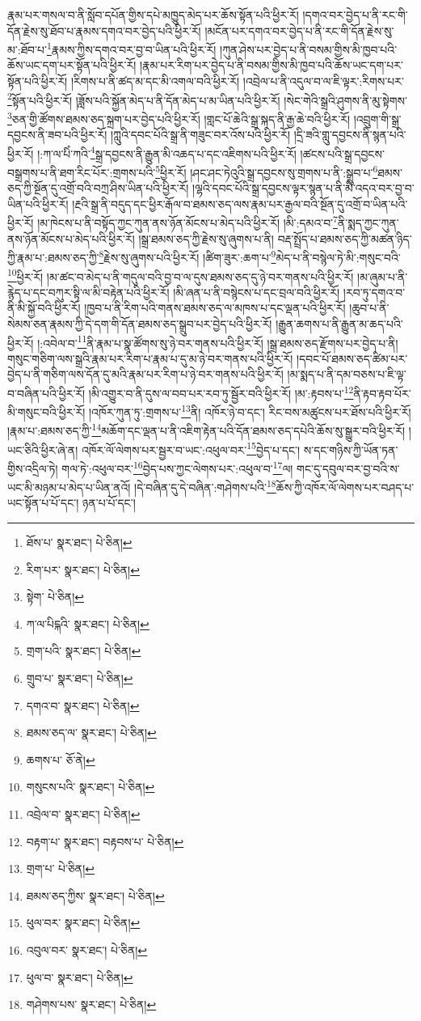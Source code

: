 རྣམ་པར་གསལ་བ་ནི་སློབ་དཔོན་གྱིས་དཔེ་མཁྱུད་མེད་པར་ཆོས་སྟོན་པའི་ཕྱིར་རོ། །དགའ་བར་བྱེད་པ་ནི་རང་གི་དོན་རྗེས་སུ་ཐོབ་པ་རྣམས་དགའ་བར་བྱེད་པའི་ཕྱིར་རོ། །མངོན་པར་དགའ་བར་བྱེད་པ་ནི་རང་གི་དོན་རྗེས་སུ་མ་:ཐོབ་པ་\footnote{ཐོས་པ་  སྣར་ཐང་།  པེ་ཅིན། }རྣམས་ཀྱིས་དགའ་བར་བྱ་བ་ཡིན་པའི་ཕྱིར་རོ། །ཀུན་ཤེས་པར་བྱེད་པ་ནི་བསམ་གྱིས་མི་ཁྱབ་པའི་ཆོས་ཡང་དག་པར་སྟོན་པའི་ཕྱིར་རོ། །རྣམ་པར་རིག་པར་བྱེད་པ་ནི་བསམ་གྱིས་མི་ཁྱབ་པའི་ཆོས་ཡང་དག་པར་སྟོན་པའི་ཕྱིར་རོ། །རིགས་པ་ནི་ཚད་མ་དང་མི་འགལ་བའི་ཕྱིར་རོ། །འབྲེལ་པ་ནི་འདུལ་བ་ལ་ཇི་ལྟར་:རིགས་པར་\footnote{རིག་པར་  སྣར་ཐང་།  པེ་ཅིན། }སྟོན་པའི་ཕྱིར་རོ། །ཟློས་པའི་སྐྱོན་མེད་པ་ནི་དོན་མེད་པ་མ་ཡིན་པའི་ཕྱིར་རོ། །སེང་གེའི་སྒྲའི་ཤུགས་ནི་མུ་སྟེགས་\footnote{སྟེག་  པེ་ཅིན། }ཅན་གྱི་ཚོགས་ཐམས་ཅད་སྐྲག་པར་བྱེད་པའི་ཕྱིར་རོ། །གླང་པོ་ཆེའི་སྒྲ་སྐད་ནི་རྒྱ་ཆེ་བའི་ཕྱིར་རོ། །འབྲུག་གི་སྒྲ་དབྱངས་ནི་ཟབ་པའི་ཕྱིར་རོ། །ཀླུའི་དབང་པོའི་སྒྲ་ནི་གཟུང་བར་འོས་པའི་ཕྱིར་རོ། །དྲི་ཟའི་གླུ་དབྱངས་ནི་སྙན་པའི་ཕྱིར་རོ། །:ཀ་ལ་པིཾ་ཀའི་\footnote{ཀ་ལ་པིངྐའི་  སྣར་ཐང་།  པེ་ཅིན། }སྒྲ་དབྱངས་ནི་རྒྱུན་མི་འཆད་པ་དང་འཇིགས་པའི་ཕྱིར་རོ། །ཚངས་པའི་སྒྲ་དབྱངས་བསྒྲགས་པ་ནི་ཐག་རིང་པོར་:གྲགས་པའི་\footnote{གྲག་པའི་  སྣར་ཐང་།  པེ་ཅིན། }ཕྱིར་རོ། །ཤང་ཤང་ཏེའུའི་སྒྲ་དབྱངས་སུ་གྲགས་པ་ནི་:སྒྲུབ་པ་\footnote{གྲུབ་པ་  སྣར་ཐང་།  པེ་ཅིན། }ཐམས་ཅད་ཀྱི་སྔོན་དུ་འགྲོ་བའི་བཀྲ་ཤིས་ཡིན་པའི་ཕྱིར་རོ། །ལྷའི་དབང་པོའི་སྒྲ་དབྱངས་ལྟར་སྙན་པ་ནི་མི་འདའ་བར་བྱ་བ་ཡིན་པའི་ཕྱིར་རོ། །རྔའི་སྒྲ་ནི་བདུད་དང་ཕྱིར་རྒོལ་བ་ཐམས་ཅད་ལས་རྣམ་པར་རྒྱལ་བའི་སྔོན་དུ་འགྲོ་བ་ཡིན་པའི་ཕྱིར་རོ། །མ་ཁེངས་པ་ནི་བསྟོད་ཀྱང་ཀུན་ནས་ཉོན་མོངས་པ་མེད་པའི་ཕྱིར་རོ། །མི་:དམའ་བ་\footnote{དགའ་བ་  སྣར་ཐང་།  པེ་ཅིན། }ནི་སྨད་ཀྱང་ཀུན་ནས་ཉོན་མོངས་པ་མེད་པའི་ཕྱིར་རོ། །སྒྲ་ཐམས་ཅད་ཀྱི་རྗེས་སུ་ཞུགས་པ་ནི། བརྡ་སྤྲོད་པ་ཐམས་ཅད་ཀྱི་མཚན་ཉིད་ཀྱི་རྣམ་པ་:ཐམས་ཅད་ཀྱི་\footnote{ཐམས་ཅད་ལ་  སྣར་ཐང་།  པེ་ཅིན། }རྗེས་སུ་ཞུགས་པའི་ཕྱིར་རོ། །ཚིག་ཟུར་:ཆག་པ་\footnote{ཆགས་པ་  ཅོ་ནེ། }མེད་པ་ནི་བསྙེལ་ཏེ་མི་:གསུང་བའི་\footnote{གསུངས་པའི་  སྣར་ཐང་།  པེ་ཅིན། }ཕྱིར་རོ། །མ་ཚང་བ་མེད་པ་ནི་གདུལ་བའི་བྱ་བ་ལ་དུས་ཐམས་ཅད་དུ་ཉེ་བར་གནས་པའི་ཕྱིར་རོ། །མ་ཞུམ་པ་ནི་རྙེད་པ་དང་བཀུར་སྟི་ལ་མི་བརྟེན་པའི་ཕྱིར་རོ། །མི་ཞན་པ་ནི་བསྙེངས་པ་དང་བྲལ་བའི་ཕྱིར་རོ། །རབ་ཏུ་དགའ་བ་ནི་མི་སྐྱོ་བའི་ཕྱིར་རོ། །ཁྱབ་པ་ནི་རིག་པའི་གནས་ཐམས་ཅད་ལ་མཁས་པ་དང་ལྡན་པའི་ཕྱིར་རོ། །ཆུབ་པ་ནི་སེམས་ཅན་རྣམས་ཀྱི་དེ་དག་གི་དོན་ཐམས་ཅད་སྒྲུབ་པར་བྱེད་པའི་ཕྱིར་རོ། །རྒྱུན་ཆགས་པ་ནི་རྒྱུན་མ་ཆད་པའི་ཕྱིར་རོ། །:འབེལ་བ་\footnote{འབྲེལ་བ་  སྣར་ཐང་།  པེ་ཅིན། }ནི་རྣམ་པ་སྣ་ཚོགས་སུ་ཉེ་བར་གནས་པའི་ཕྱིར་རོ། །སྒྲ་ཐམས་ཅད་རྫོགས་པར་བྱེད་པ་ནི། གསུང་གཅིག་ལས་སྒྲའི་རྣམ་པར་རིག་པ་རྣམ་པ་དུ་མ་ཉེ་བར་གནས་པའི་ཕྱིར་རོ། །དབང་པོ་ཐམས་ཅད་ཚིམ་པར་བྱེད་པ་ནི་གཅིག་ལས་དོན་དུ་མའི་རྣམ་པར་རིག་པ་ཉེ་བར་གནས་པའི་ཕྱིར་རོ། །མ་སྨད་པ་ནི་དམ་བཅས་པ་ཇི་ལྟ་བ་བཞིན་པའི་ཕྱིར་རོ། །མི་འགྱུར་བ་ནི་དུས་ལ་བབ་པར་རབ་ཏུ་སྦྱོར་བའི་ཕྱིར་རོ། །མ་:རྟབས་པ་\footnote{བརྟག་པ་  སྣར་ཐང་། བརྟབས་པ་  པེ་ཅིན། }ནི་རྟབ་རྟབ་པོར་མི་གསུང་བའི་ཕྱིར་རོ། །འཁོར་ཀུན་ཏུ་:གྲགས་པ་\footnote{གྲག་པ་  པེ་ཅིན། }ནི། འཁོར་ཉེ་བ་དང་། རིང་བས་མཚུངས་པར་ཐོས་པའི་ཕྱིར་རོ། །རྣམ་པ་:ཐམས་ཅད་ཀྱི་\footnote{ཐམས་ཅད་ཀྱིས་  སྣར་ཐང་།  པེ་ཅིན། }མཆོག་དང་ལྡན་པ་ནི་འཇིག་རྟེན་པའི་དོན་ཐམས་ཅད་དཔེའི་ཆོས་སུ་སྒྱུར་བའི་ཕྱིར་རོ། །ཡང་ཅིའི་ཕྱིར་ཞེ་ན། འཁོར་ལོ་ལེགས་པར་སྦྱར་བ་ཡང་:འཕུལ་བར་\footnote{ཕུལ་བར་  སྣར་ཐང་།  པེ་ཅིན། }བྱེད་པ་དང་། ས་དང་གཉིས་ཀྱི་ཡོན་ཏན་གྱིས་འདྲིལ་ཏེ། གལ་ཏེ་:འཕུལ་བར་\footnote{འབུལ་བར་  སྣར་ཐང་།  པེ་ཅིན། }བྱེད་པས་ཀྱང་ལེགས་པར་:འཕུལ་བ་\footnote{ཕུལ་བ་  སྣར་ཐང་།  པེ་ཅིན། }ལ། གང་དུ་དབུལ་བར་བྱ་བའི་ས་ཡང་མི་མཉམ་པ་མེད་པ་ཡིན་ནའོ། །དེ་བཞིན་དུ་དེ་བཞིན་:གཤེགས་པའི་\footnote{གཤེགས་པས་  སྣར་ཐང་།  པེ་ཅིན། }ཆོས་ཀྱི་འཁོར་ལོ་ལེགས་པར་བཤད་པ་ཡང་སྟོན་པ་པོ་དང་། ཉན་པ་པོ་དང་། 